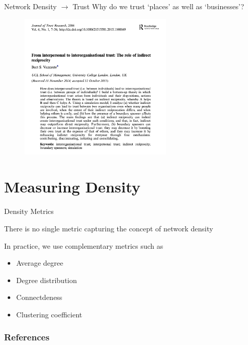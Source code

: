 \documentclass[notes, aspectratio=1610]{beamer}
\begin{document}
\begin{frame}
	{Network Density $\rightarrow$ Trust}
	{Why do we trust `places' as well as `businesses'?}
        \begin{figure}
        	\begin{center}
        		\includegraphics[width=0.65\textwidth]{images/trust_research.png}
        	\end{center}
        \end{figure}
\end{frame}

\section{Measuring Density}

\begin{frame}{Density Metrics}
	\begin{tcolorbox}[
		colback=comp_c!5!white,
		colframe=comp_c!90!black,
		title={\centering !! Pay attention !!}]
		There is no single metric capturing the concept of network density
	\end{tcolorbox}

	\vspace{2em}

	In practice, we use complementary metrics such as 

	\begin{itemize}
		\item Average degree 
		\item Degree distribution 
		\item Connectdeness
		\item Clustering coefficient
	\end{itemize}
\end{frame}

\begin{frame}
	\frametitle{References}
	\printbibliography
 \end{frame} 

\end{document}
